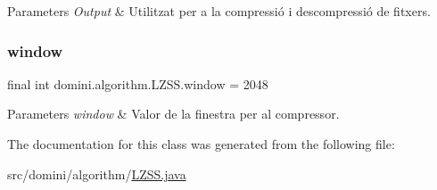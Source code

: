 \begin{DoxyParams}{Parameters}
{\em Output} & Utilitzat per a la compressió i descompressió de fitxers. \\
\hline
\end{DoxyParams}
\mbox{\label{classdomini_1_1algorithm_1_1LZSS_a00d9f2e9bc2baa39513fad040b8e7123}} 
\subsubsection{\texorpdfstring{window}{window}}
{\footnotesize\ttfamily final int domini.\+algorithm.\+L\+Z\+S\+S.\+window = 2048\hspace{0.3cm}{\ttfamily [private]}}


\begin{DoxyParams}{Parameters}
{\em window} & Valor de la finestra per al compressor. \\
\hline
\end{DoxyParams}


The documentation for this class was generated from the following file\+:\begin{DoxyCompactItemize}
\item 
src/domini/algorithm/\hyperlink{LZSS_8java}{L\+Z\+S\+S.\+java}\end{DoxyCompactItemize}
